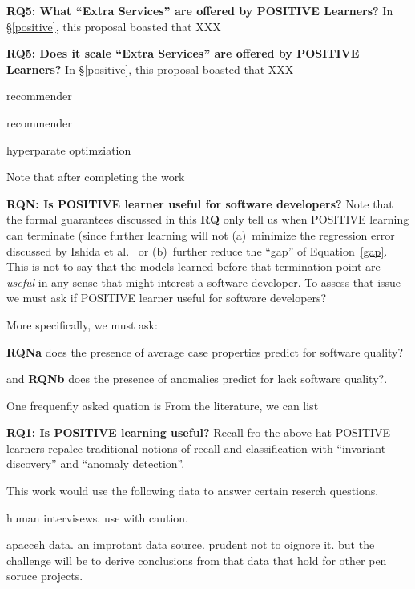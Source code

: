 {\bf RQ5: What ``Extra Services'' are offered by POSITIVE Learners?}
In \S\ref{positive}, this proposal boasted that XXX


{\bf RQ5: Does it scale ``Extra Services'' are offered by POSITIVE Learners?}
In \S\ref{positive}, this proposal boasted that XXX



recommender


recommender

hyperparate optimziation



Note that after completing the work 


{\bf RQN:  Is  POSITIVE learner useful for software developers?}
Note that 
the formal guarantees discussed in  this {\bf RQ}
only tell us when POSITIVE learning can terminate (since further
learning will not (a)~minimize the regression error discussed by 
 Ishida et al.~\cite{ishida2018binary} 
 or (b)~further reduce the ``gap'' of Equation~\ref{gap}.
 This is not to say that the models learned before that termination
 point are {\em useful} in any sense that might interest a software
 developer.  To assess that issue we must ask if
 POSITIVE learner useful for software developers?

 More specifically, we must ask:
 \bi
 \item{\bf RQNa} 
does the presence of average case properties predict for software quality?
\item
and 
 {\bf RQNb }
does the presence of anomalies  predict for lack 
software quality?. 
\ei

 

 
  


One frequenfly asked quation is
From the literature, we can list

\item




{\bf RQ1: Is POSITIVE learning useful?} Recall fro the above hat POSITIVE learners repalce traditional notions of recall and classification with ``invariant  discovery''  and  “anomaly  detection”.   


This work would use the following data to answer certain reserch questions.

human intervisews. use with caution.

apacceh data. an improtant data source. prudent not to oignore it. but the challenge will be to derive conclusions from that data that hold for other pen soruce projects.

